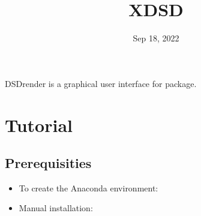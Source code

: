 \documentclass[a4paper,12pt,oneside,english]{sphinxmanual}
\title{XDSD}
\date{Sep 18, 2022}
\author{}
\begin{document}
\maketitle
\sphinxtableofcontents
{}\label{\detokenize{index::doc}}


DSDrender is a graphical user interface for  package.


\chapter{Tutorial}
\label{\detokenize{tutorial:DSDrender-documentation}}\label{\detokenize{tutorial:tutorial}}\label{\detokenize{tutorial::doc}}

\section{Prerequisities}
\label{\detokenize{tutorial:prerequisities}}\begin{itemize}
\item {} 
To create the Anaconda environment:

\end{itemize}

%
\begin{sphinxVerbatim}[commandchars=\\\{\}]
    
   
\end{sphinxVerbatim}
\begin{itemize}
\item {} 
Manual installation:

\end{itemize}

%
\begin{sphinxVerbatim}[commandchars=\\\{\}]
    
    
    
    
    
     
\end{sphinxVerbatim}
\end{document}
